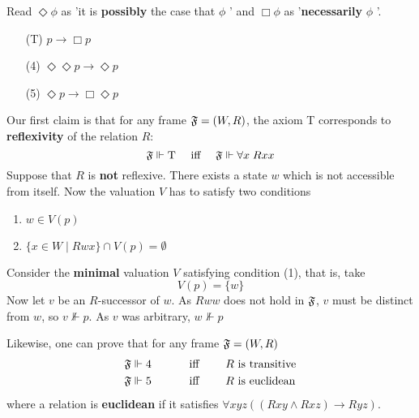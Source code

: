 \documentclass[11pt]{article}
\begin{document}
\begin{examplle}[]
Read \(\Diamond\phi\) as 'it is \textbf{possibly} the case that \(\phi\) ' and \(\Box\phi\) as
'\textbf{necessarily} \(\phi\)  '.
\begin{itemize}
\item [(T)] \(p\to\Box p\)
\item [(4)] \(\Diamond\Diamond p\to\Diamond p\)
\item [(5)] \(\Diamond p\to\Box\Diamond p\)
\end{itemize}

Our first claim is that for any frame \(\mathfrak{F}=(W,R)\), the axiom T corresponds
to \textbf{reflexivity} of the relation \(R\):
\begin{equation*}
\mathfrak{F}\Vdash \text{T}\quad\text{ iff }\quad
\mathfrak{F}\Vdash\forall x\;Rxx
\end{equation*}
Suppose that \(R\) is \textbf{not} reflexive. There exists a state \(w\) which is not
accessible from itself. Now the valuation \(V\) has to satisfy two conditions
\begin{enumerate}
\item \(w\in V(p)\)
\item \(\{x\in W\mid Rwx\}\cap V(p)=\emptyset\)
\end{enumerate}


Consider the \textbf{minimal} valuation \(V\) satisfying condition (1), that is, take
\begin{equation*}
V(p)=\{w\}
\end{equation*}
Now let \(v\) be an \(R\)-successor of \(w\). As \(Rww\) does not hold in
\(\mathfrak{F}\), \(v\) must be distinct from \(w\), so \(v\not\Vdash p\). As \(v\)
was arbitrary, \(w\not\Vdash p\)

Likewise, one can prove that for any frame \(\mathfrak{F}=(W,R)\)
\begin{alignat*}{3}
&\mathfrak{F}\Vdash4&&\quad\text{ iff }\quad&&R\text{ is transitive}\\
&\mathfrak{F}\Vdash5\quad&&\quad\text{ iff }\quad&&
R \text{ is euclidean}
\end{alignat*}
where a relation is \textbf{euclidean} if it satisfies \(\forall xyz((Rxy\wedge
   Rxz)\to Ryz)\).


\end{examplle}
\end{document}
